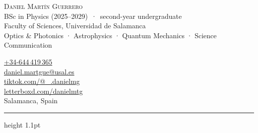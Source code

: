\documentclass[10pt,a4paper]{article}
\newcommand{\icon}[1]{\makebox[1.15em][c]{\color{accent}#1}}
\begin{document}
\fontsize{9.6}{11.35}\selectfont\color{ink}

\begin{minipage}[t]{0.62\linewidth}
  \vspace{0pt}
  {\fontsize{18}{20}\selectfont\scshape\color{accent} Daniel Martín Guerrero}\\[0.6ex]
  BSc in Physics (2025--2029) \,·\, second-year undergraduate\\
  Faculty of Sciences, Universidad de Salamanca\\[0.2ex]
  {\small\color{muted}Optics \& Photonics \textcolor{accent}{·} Astrophysics \textcolor{accent}{·} Quantum Mechanics \textcolor{accent}{·} Science Communication}
\end{minipage}%
\hfill
\begin{minipage}[t]{0.36\linewidth}
  \vspace{0.1ex}
  \raggedleft
  \href{tel:+34644419365}{+34-644\,419\,365}\,\icon{\faPhone}\\
  \href{mailto:daniel.martgue@usal.es}{daniel.martgue@usal.es}\,\icon{\faEnvelope}\\
  \href{https://www.tiktok.com/@_.danielmg}{tiktok.com/@\_.danielmg}\,\icon{\faTiktok}\\
  \href{https://letterboxd.com/danielmtg/}{letterboxd.com/danielmtg}\,\icon{\faFilm}\\
  Salamanca, Spain\,\icon{\faMapMarker*}
\end{minipage}

\vspace{1.2ex}
{\color{accent}\hrule height 1.1pt}
\vspace{-0.3ex}

\end{document}
